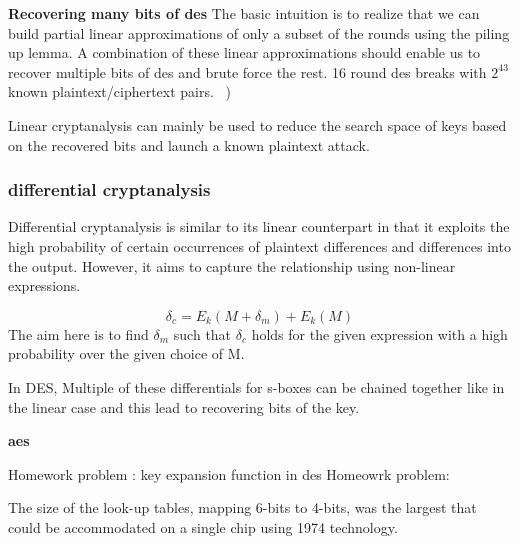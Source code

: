 

\textbf{Recovering many bits of des} The basic intuition is to realize that we can build partial linear approximations of only a subset
of the rounds using the piling up lemma. A combination of these linear approximations should enable us to recover multiple bits of des
and brute force the rest. 16 round des breaks with \(2^{43} \)  known plaintext/ciphertext pairs.
\ )

Linear cryptanalysis can mainly be used to reduce the search space of keys based on the recovered bits and launch a known plaintext attack.

\subsubsection*{differential cryptanalysis}
Differential cryptanalysis is similar to its linear counterpart in that it exploits the high probability of certain occurrences of plaintext
differences and differences into the output. However, it aims to capture the relationship using non-linear expressions.

\[ \delta_c = E_k(M + \delta_m) + E_k(M) \] 
The aim here is to find \( \delta_m \) such that \( \delta_c \) holds for the given expression with a high probability over the given choice of M. \newline

In DES, Multiple of these differentials for s-boxes can be chained together like in the linear case and this lead to recovering bits of the key.


\textbf*{aes}


\iffalse

Homework problem : key expansion function in des
Homeowrk problem: 

The size of the look-up tables, mapping 6-bits to 4-bits, was the largest that could be accommodated
on a single chip using 1974 technology.

